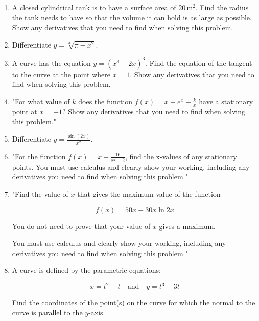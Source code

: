 \documentclass{article}
\begin{document}
\begin{enumerate}
\vspace{3cm}
\item A closed cylindrical tank is to have a surface area of \(20 \, \text{m}^2\). Find the radius the tank needs to have so that the volume it can hold is as large as possible. Show any derivatives that you need to find when solving this problem.
\vspace{3cm}
\item Differentiate \( y = \sqrt[3]{\pi - x^2} \).
\vspace{3cm}
\item A curve has the equation \( y = (x^3 - 2x)^3 \). Find the equation of the tangent to the curve at the point where \( x = 1 \). Show any derivatives that you need to find when solving this problem.
\vspace{3cm}
\item "For what value of \( k \) does the function \( f(x) = x - e^x - \frac{k}{x} \) have a stationary point at \( x = -1 \)? Show any derivatives that you need to find when solving this problem."
\vspace{3cm}
\item Differentiate \( y = \frac{\sin(2x)}{x^2} \).
\vspace{3cm}
\item "For the function \( f(x) = x + \frac{16}{x^2 - 2} \), find the x-values of any stationary points. You must use calculus and clearly show your working, including any derivatives you need to find when solving this problem."
\vspace{3cm}
\item "Find the value of \( x \) that gives the maximum value of the function

\[ f(x) = 50x - 30x \ln 2x \]

You do not need to prove that your value of \( x \) gives a maximum.

You must use calculus and clearly show your working, including any derivatives you need to find when solving this problem."
\vspace{3cm}
\item A curve is defined by the parametric equations:

\[ x = t^2 - t \quad \text{and} \quad y = t^3 - 3t \]

Find the coordinates of the point(s) on the curve for which the normal to the curve is parallel to the \( y \)-axis.


\end{enumerate}
\end{document}

